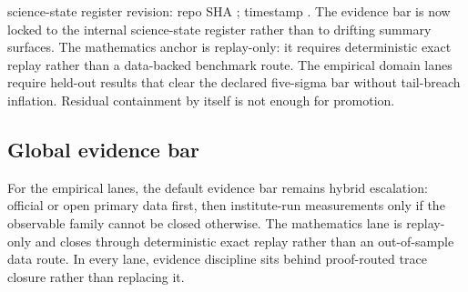 science-state register revision: repo SHA ; timestamp .
The evidence bar is now locked to the internal science-state register rather than to drifting summary surfaces. The mathematics anchor is replay-only: it requires deterministic exact replay rather than a data-backed benchmark route. The empirical domain lanes require held-out results that clear the declared five-sigma bar without tail-breach inflation. Residual containment by itself is not enough for promotion.

\subsection{Global evidence bar}
For the empirical lanes, the default evidence bar remains hybrid escalation: official or open primary data first, then institute-run measurements only if the observable family cannot be closed otherwise. The mathematics lane is replay-only and closes through deterministic exact replay rather than an out-of-sample data route. In every lane, evidence discipline sits behind proof-routed trace closure rather than replacing it.

